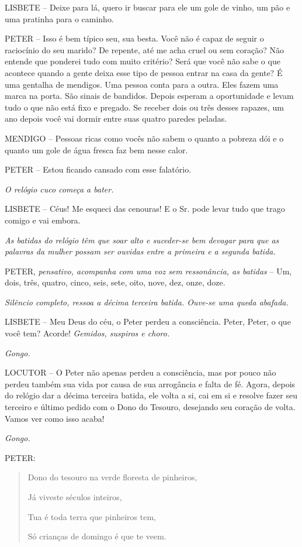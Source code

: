 LISBETE -- Deixe para lá, quero ir buscar para ele um gole de vinho, um
pão e uma pratinha para o caminho.

PETER -- Isso é bem típico seu, sua besta. Você não é capaz de seguir o
raciocínio do seu marido? De repente, até me acha cruel ou sem coração?
Não entende que ponderei tudo com muito critério? Será que você não sabe
o que acontece quando a gente deixa esse tipo de pessoa entrar na casa
da gente? É uma gentalha de mendigos. Uma pessoa conta para a outra.
Eles fazem uma marca na porta. São sinais de bandidos. Depois esperam a
oportunidade e levam tudo o que não está fixo e pregado. Se receber dois
ou três desses rapazes, um ano depois você vai dormir entre suas quatro
paredes peladas.

MENDIGO -- Pessoas ricas como vocês não sabem o quanto a pobreza dói e o
quanto um gole de água fresca faz bem nesse calor.

PETER -- Estou ficando cansado com esse falatório.

\emph{O relógio cuco começa a bater.}

LISBETE -- Céus! Me esqueci das cenouras! E o Sr. pode levar tudo que
trago comigo e vai embora.

\emph{As batidas do relógio têm que soar alto e suceder-se bem devagar
para que as palavras da mulher possam ser ouvidas entre a primeira e a
segunda batida.}

PETER, \emph{pensativo, acompanha com uma voz sem ressonância, as
batidas} -- Um, dois, três, quatro, cinco, seis, sete, oito, nove, dez,
onze, doze.

\emph{Silêncio completo, ressoa a décima terceira batida. Ouve-se uma
queda abafada.}

LISBETE -- Meu Deus do céu, o Peter perdeu a consciência. Peter, Peter,
o que você tem? Acorde! \emph{Gemidos, suspiros e choro.}

\emph{Gongo.}

LOCUTOR -- O Peter não apenas perdeu a consciência, mas por pouco não
perdeu também sua vida por causa de sua arrogância e falta de fé. Agora,
depois do relógio dar a décima terceira batida, ele volta a si, cai em
si e resolve fazer seu terceiro e último pedido com o Dono do Tesouro,
desejando seu coração de volta. Vamos ver como isso acaba!

\emph{Gongo.}

PETER:

\begin{quote}
Dono do tesouro na verde floresta de pinheiros,

Já viveste séculos inteiros,

Tua é toda terra que pinheiros tem,

Só crianças de domingo é que te veem.
\end{quote}

